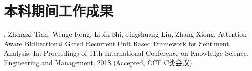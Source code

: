 
\chapter{本科期间工作成果}

. Zhengxi Tian, Wenge Rong, Libin Shi, Jingshuang Liu, Zhang Xiong. Attention Aware Bidirectional Gated Recurrent Unit Based Framework for Sentiment Analysis. In: Proceedings of 11th International Conference on Knowledge Science, Engineering and Management. 2018 (Accepted, CCF C类会议)